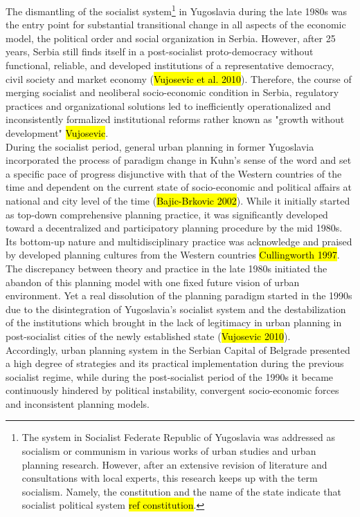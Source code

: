 \documentclass[11pt]{report}
\begin{document}
The  dismantling  of  the  socialist system\footnote{The system in Socialist Federate Republic of Yugoslavia was addressed as socialism or communism in various works of urban studies and urban planning research. However, after an extensive revision of literature and consultations with local experts, this research keeps up with the term socialism. Namely, the constitution and the name of the state indicate that socialist political system \hl{ref constitution}.}
in Yugoslavia during the late 1980s was the entry point for substantial transitional change in all aspects of the economic model, the political order and social organization in Serbia. 
However, after 25 years, Serbia still finds itself in a post-socialist proto-democracy without functional, reliable, and developed institutions of a representative 
democracy, civil society and market economy (\hl{Vujosevic et al. 2010}). 
Therefore, the course of merging socialist and neoliberal socio-economic condition in Serbia, regulatory practices and organizational solutions led to inefficiently operationalized and inconsistently formalized institutional reforms rather known as "growth without development" \hl{Vujosevic}.
\\
During the socialist period, general urban planning in former Yugoslavia incorporated the process of paradigm change in Kuhn’s sense of the word and set a specific pace of progress disjunctive with that of the Western countries of the time and dependent on the current state of socio-economic and political affairs at national and city level of the time (\hl{Bajic-Brkovic 2002}).
While it initially started as top-down comprehensive planning practice, it was significantly developed toward a decentralized and participatory planning procedure by the mid 1980s. Its bottom-up nature and multidisciplinary practice was acknowledge and praised by developed planning cultures from the Western countries \hl{Cullingworth 1997}.
The discrepancy between theory and practice in the late 1980s initiated the abandon of this planning model with one fixed future vision of urban environment.
Yet a real dissolution of the planning paradigm started in the 1990s due to the disintegration of Yugoslavia’s socialist system and the destabilization of the institutions which brought in the lack of legitimacy in urban planning in post-socialist cities of the newly established state (\hl{Vujosevic 2010}).
\\
Accordingly,  urban planning system in the Serbian Capital  of  Belgrade presented  a  high  degree  of  strategies  and  its practical  implementation  during  the  previous  socialist  regime,  while during the post-socialist period of the 1990s  it became  continuously  hindered  by  political instability, convergent socio-economic forces and inconsistent planning models.
\end{document}
